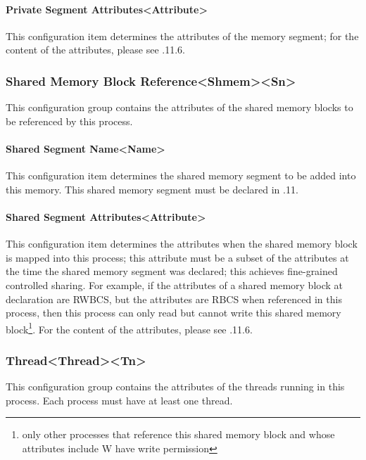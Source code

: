 \paragraph{Private Segment Attributes<Attribute>{}}\label{par:5-3-14-14-6}

This configuration item determines the attributes of the memory segment; for the content of the attributes, please see .11.6.

\subsubsection{Shared Memory Block Reference<Shmem><Sn>{}}\label{subsubsec:5-3-14-15}

This configuration group contains the attributes of the shared memory blocks to be referenced by this process.

\paragraph{Shared Segment Name<Name>{}}\label{par:5-3-14-15-1}

This configuration item determines the shared memory segment to be added into this memory. This shared memory segment must be declared in .11.

\paragraph{Shared Segment Attributes<Attribute>{}}\label{par:5-3-14-15-2}

This configuration item determines the attributes when the shared memory block is mapped into this process; this attribute must be a subset of the attributes at the time the shared memory segment was declared; this achieves fine-grained controlled sharing. For example, if the attributes of a shared memory block at declaration are RWBCS, but the attributes are RBCS when referenced in this process, then this process can only read but cannot write this shared memory block\footnote{only other processes that reference this shared memory block and whose attributes include W have write permission}. For the content of the attributes, please see .11.6.

\subsubsection{Thread<Thread><Tn>{}}\label{subsubsec:5-3-14-16}

This configuration group contains the attributes of the threads running in this process. Each process must have at least one thread.

